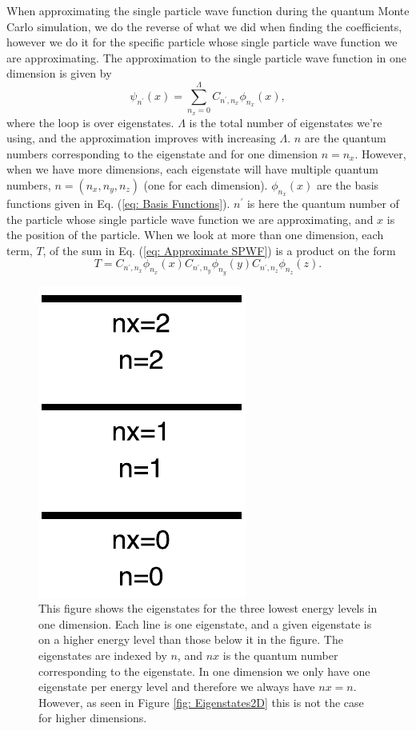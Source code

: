 \documentclass[../main.tex]{subfiles}
\begin{document}
When approximating the single particle wave function during the quantum Monte Carlo simulation, we do the reverse of what we did when finding the coefficients, however we do it for the specific particle whose single particle wave function we are approximating. The approximation to the single particle wave function in one dimension is given by
\begin{equation}\label{eq: Approximate SPWF}
    \psi_{n^\prime}(x) = \sum_{n_x=0}^{\Lambda} C_{n^\prime,n_x} \phi_{n_x}(x),
\end{equation}
where the loop is over eigenstates. $\Lambda$ is the total number of eigenstates we're using, and the approximation improves with increasing $\Lambda$. $n$ are the quantum numbers corresponding to the eigenstate and for one dimension $n = n_x$. However, when we have more dimensions, each eigenstate will have multiple quantum numbers, $n = (n_x,n_y,n_z)$ (one for each dimension). $\phi_{n_x}(x)$ are the basis functions given in Eq. (\ref{eq: Basis Functions}). $n^\prime$ is here the quantum number of the particle whose single particle wave function we are approximating, and $x$ is the position of the particle. When we look at more than one dimension, each term, $T$, of the sum in Eq. (\ref{eq: Approximate SPWF}) is a product on the form
\begin{equation}
    T = C_{n^\prime,n_x} \phi_{n_x}(x)C_{n^\prime,n_y} \phi_{n_y}(y)C_{n^\prime,n_z} \phi_{n_z}(z).
\end{equation}

\begin{figure}[!ht]
    \centering
    \includegraphics[scale=0.7]{figures/Eigenstates1D}
    \caption{This figure shows the eigenstates for the three lowest energy levels in one dimension. Each line is one eigenstate, and a given eigenstate is on a higher energy level than those below it in the figure. The eigenstates are indexed by $n$, and $nx$ is the quantum number corresponding to the eigenstate. In one dimension we only have one eigenstate per energy level and therefore we always have $nx=n$. However, as seen in Figure \ref{fig: Eigenstates2D} this is not the case for higher dimensions.}
    \label{fig: Eigenstates1D}
\end{figure}
\end{document}
